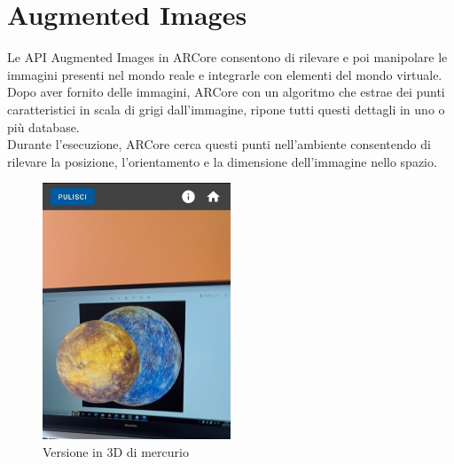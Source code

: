 \documentclass[crop=false, class=book]{standalone}
\begin{document}
	\chapter{Augmented Images}
	
	
	Le API Augmented Images in ARCore consentono di rilevare e poi manipolare le immagini presenti nel mondo reale e integrarle con elementi del mondo virtuale. \\
	\noindent
	Dopo aver fornito delle immagini, ARCore con un algoritmo che estrae dei punti caratteristici in scala di grigi dall’immagine, ripone tutti questi dettagli in uno o più database. \\
	\noindent
	Durante l’esecuzione, ARCore cerca questi punti nell’ambiente consentendo di rilevare la posizione, l’orientamento e la dimensione dell’immagine nello spazio.
	\begin{figure}
	\centering
	\includegraphics[width=0.5\textwidth]{./resources/images/AugmentedImages/Img1.jpeg}
	\caption{Versione in 3D di mercurio} 
	\end{figure}
\end{document}
